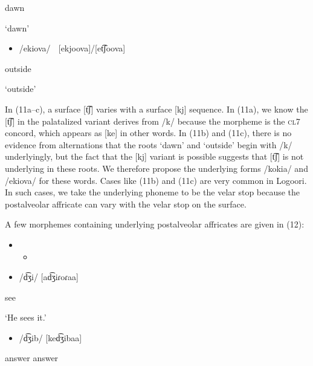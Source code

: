 dawn

‘dawn’

\begin{itemize}
\item /ekiova/    [ekjoova]/[et͡ʃoova]

\end{itemize}

outside

‘outside’

In (11a–c), a surface [t͡ʃ] varies with a surface [kj] sequence. In (11a), we know the [t͡ʃ] in the palatalized variant derives from /k/ because the morpheme is the \textsc{cl}7 concord, which appears as [ke] in other words. In (11b) and (11c), there is no evidence from alternations that the roots ‘dawn’ and ‘outside’ begin with /k/ underlyingly, but the fact that the [kj] variant is possible suggests that [t͡ʃ] is not underlying in these roots. We therefore propose the underlying forms /kokia/ and /ekiova/ for these words. Cases like (11b) and (11c) are very common in Logoori. In such cases, we take the underlying phoneme to be the velar stop because the postalveolar affricate can vary with the velar stop on the surface. 

A few morphemes containing underlying postalveolar affricates are given in (12):

\setcounter{itemize}{0}
\begin{itemize}
\item \setcounter{itemize}{0}
\begin{itemize}
\item \end{itemize}
\end{itemize}
\setcounter{itemize}{0}
\begin{itemize}
\item /d͡ʒi/  [ad͡ʒiɾoɾaa]

\end{itemize}

see

\textsc{    ‘}He sees it.’

\begin{itemize}
\item /d͡ʒib/  [ked͡ʒibaa]

\end{itemize}

answer  answer

